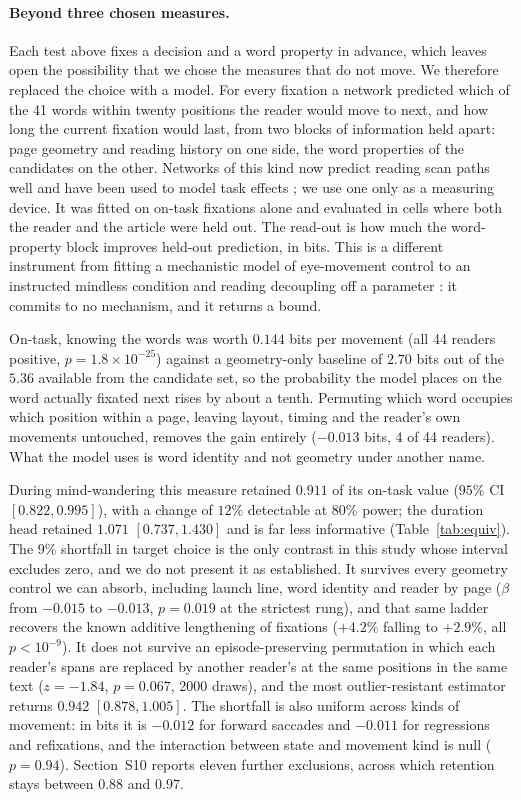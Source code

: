 \documentclass[11pt]{article}
\begin{document}
\paragraph{Beyond three chosen measures.} Each test above fixes a decision and a word
property in advance, which leaves open the possibility that we chose the measures that do not
move. We therefore replaced the choice with a model. For every fixation a network predicted
which of the 41 words within twenty positions the reader would move to next, and how long the
current fixation would last, from two blocks of information held apart: page geometry and
reading history on one side, the word properties of the candidates on the other. Networks of
this kind now predict reading scan paths well \citep{deng2023eyettention,bolliger2025scandl} and
have been used to model task effects \citep{hahn2023task}; we use one only as a measuring
device. It was fitted on on-task fixations alone and evaluated in cells where both the reader
and the article were held out. The read-out is how much the word-property block improves
held-out prediction, in bits. This is a different instrument from fitting a mechanistic model of
eye-movement control to an instructed mindless condition and reading decoupling off a parameter
\citep{nuthmann2009}: it commits to no mechanism, and it returns a bound.

On-task, knowing the words was worth $0.144$ bits per movement (all 44 readers positive,
$p=1.8\times10^{-25}$) against a geometry-only baseline of $2.70$ bits out of the $5.36$
available from the candidate set, so the probability the model places on the word actually
fixated next rises by about a tenth. Permuting which word occupies which position within a
page, leaving layout, timing and the reader's own movements untouched, removes the gain entirely
($-0.013$ bits, 4 of 44 readers). What the model uses is word identity and not geometry under
another name.

During mind-wandering this measure retained $0.911$ of its on-task value ($95\%$ CI
$[0.822, 0.995]$), with a change of $12\%$ detectable at 80\% power; the duration head retained
$1.071$ $[0.737, 1.430]$ and is far less informative (Table~\ref{tab:equiv}). The $9\%$
shortfall in target choice is the only contrast in this study whose interval excludes zero, and
we do not present it as established. It survives every geometry control we can absorb, including
launch line, word identity and reader by page ($\beta$ from $-0.015$ to $-0.013$, $p=0.019$ at
the strictest rung), and that same ladder recovers the known additive lengthening of fixations
($+4.2\%$ falling to $+2.9\%$, all $p<10^{-9}$). It does not survive an episode-preserving
permutation in which each reader's spans are replaced by another reader's at the same positions
in the same text ($z=-1.84$, $p=0.067$, 2000 draws), and the most outlier-resistant estimator
returns $0.942$ $[0.878, 1.005]$. The shortfall is also uniform across kinds of movement: in
bits it is $-0.012$ for forward saccades and $-0.011$ for regressions and refixations, and the
interaction between state and movement kind is null ($p=0.94$). Section~S10 reports eleven
further exclusions, across which retention stays between $0.88$ and $0.97$.
\end{document}
